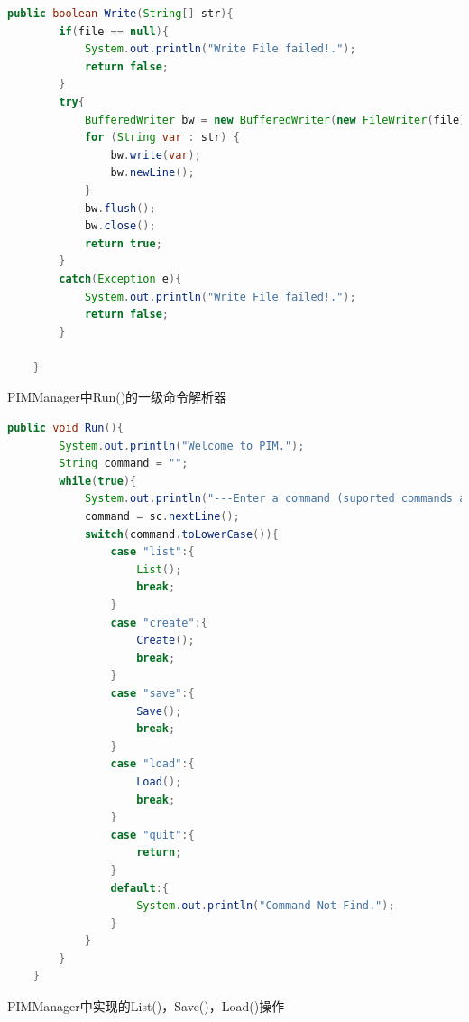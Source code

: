 \documentclass[a4paper]{article}
\begin{document}
\begin{lstlisting}[language=Java]
    public boolean Write(String[] str){
        if(file == null){
            System.out.println("Write File failed!.");
            return false;
        }
        try{
            BufferedWriter bw = new BufferedWriter(new FileWriter(file));
            for (String var : str) {
                bw.write(var);
                bw.newLine();
            }
            bw.flush();
            bw.close();
            return true;
        }
        catch(Exception e){
            System.out.println("Write File failed!.");
            return false;
        }

    }
\end{lstlisting}

PIMManager中Run()的一级命令解析器

\begin{lstlisting}[language=Java]
    public void Run(){
        System.out.println("Welcome to PIM.");
        String command = "";
        while(true){
            System.out.println("---Enter a command (suported commands are List Create Save Load Quit)---");
            command = sc.nextLine();
            switch(command.toLowerCase()){
                case "list":{
                    List();
                    break;
                }
                case "create":{
                    Create();
                    break;
                }
                case "save":{
                    Save();
                    break;
                }
                case "load":{
                    Load();
                    break;
                }
                case "quit":{
                    return;
                }
                default:{
                    System.out.println("Command Not Find.");
                }
            }
        }
    }
\end{lstlisting}

PIMManager中实现的List()，Save()，Load()操作
\end{document}
